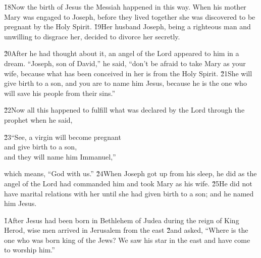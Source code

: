 \v{18}Now the birth of Jesus the Messiah happened in this way. When his mother Mary was engaged to Joseph, before they lived together she was discovered to be pregnant by the Holy Spirit. \v{19}Her husband Joseph, being a righteous man and unwilling to disgrace her, decided to divorce her secretly.

\v{20}After he had thought about it, an angel of the Lord appeared to him in a dream. ``Joseph, son of David,'' he said, ``don't be afraid to take Mary as your wife, because what has been conceived in her is from the Holy Spirit. \v{21}She will give birth to a son, and you are to name him Jesus, because he is the one who will save his people from their sins.''

\v{22}Now all this happened to fulfill what was declared by the Lord through the prophet when he said,

\begin{poetry}
\poeml \v{23}``See, a virgin will become pregnant \\
\poemll    and give birth to a son, \\
\poemlll       and they will name him Immanuel,''
\end{poetry}

which means, ``God with us.'' \v{24}When Joseph got up from his sleep, he did as the angel of the Lord had commanded him and took Mary as his wife. \v{25}He did not have marital relations with her until she had given birth to a son; and he named him Jesus.

\v{1}After Jesus had been born in Bethlehem of Judea during the reign of King Herod, wise men arrived in Jerusalem from the east \v{2}and asked, ``Where is the one who was born king of the Jews? We saw his star in the east and have come to worship him.''


